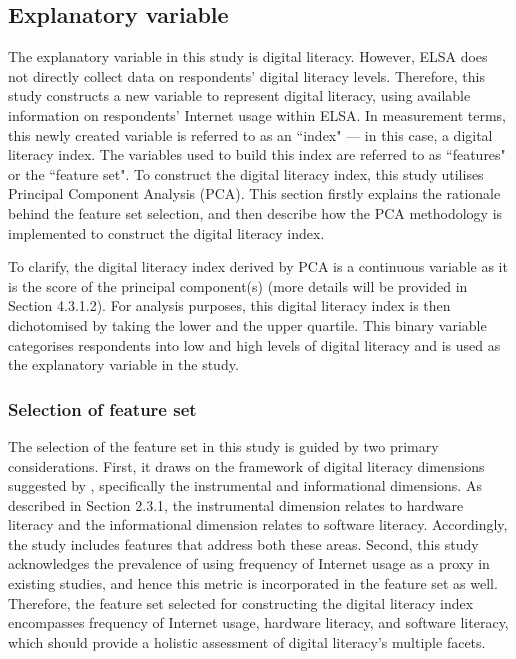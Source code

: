 \subsection{Explanatory variable}
The explanatory variable in this study is digital literacy. However, ELSA does not directly collect data on respondents' digital literacy levels. Therefore, this study constructs a new variable to represent digital literacy, using available information on respondents' Internet usage within ELSA. In measurement terms, this newly created variable is referred to as an ``index" — in this case, a digital literacy index. The variables used to build this index are referred to as ``features" or the ``feature set". To construct the digital literacy index, this study utilises Principal Component Analysis (PCA). This section firstly explains the rationale behind the feature set selection, and then describe how the PCA methodology is implemented to construct the digital literacy index.

To clarify, the digital literacy index derived by PCA is a continuous variable as it is the score of the principal component(s) (more details will be provided in Section 4.3.1.2). For analysis purposes, this digital literacy index is then dichotomised by taking the lower and the upper quartile. This binary variable categorises respondents into low and high levels of digital literacy and is used as the explanatory variable in the study. 

\subsubsection{Selection of feature set}
The selection of the feature set in this study is guided by two primary considerations. First, it draws on the framework of digital literacy dimensions suggested by \textcite[p. 21]{vandijk_deepening_2005}, specifically the instrumental and informational dimensions. As described in Section 2.3.1, the instrumental dimension relates to hardware literacy and the informational dimension relates to software literacy. Accordingly, the study includes features that address both these areas. Second, this study acknowledges the prevalence of using frequency of Internet usage as a proxy in existing studies, and hence this metric is incorporated in the feature set as well. Therefore, the feature set selected for constructing the digital literacy index encompasses frequency of Internet usage, hardware literacy, and software literacy, which should provide a holistic assessment of digital literacy's multiple facets.

